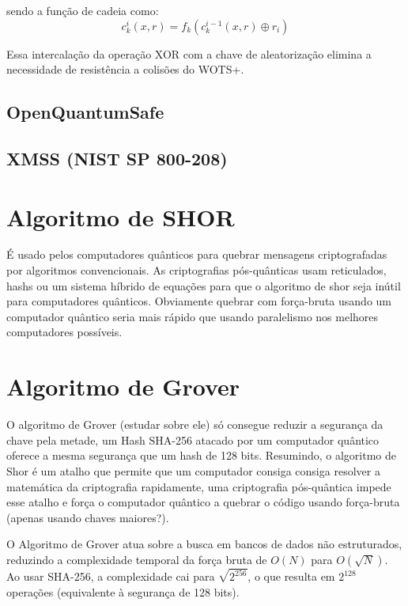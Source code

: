 \documentclass[12pt, a4paper]{report}
\begin{document}
sendo a função de cadeia como:
$$c^i_k(x,r)=f_k(c^{i-1}_k(x,r) \oplus r_i)$$

Essa intercalação da operação XOR com a chave de aleatorização elimina a necessidade de resistência a colisões do WOTS+.

\subsection{OpenQuantumSafe}
\subsection{XMSS (NIST SP 800-208)}


\section{Algoritmo de SHOR}
É usado pelos computadores quânticos para quebrar mensagens criptografadas por algoritmos convencionais. As criptografias pós-quânticas usam reticulados, hashs ou um sistema híbrido de equações para que o algoritmo de shor seja inútil para computadores quânticos. Obviamente quebrar com força-bruta usando um computador quântico seria mais rápido que usando paralelismo nos melhores computadores possíveis. 

\section{Algoritmo de Grover}
O algoritmo de Grover (estudar sobre ele) só consegue reduzir a segurança da chave pela metade, um Hash SHA-256 atacado por um computador quântico oferece a mesma segurança que um hash de 128 bits. Resumindo, o algoritmo de Shor é um atalho que permite que um computador consiga consiga resolver a matemática da criptografia rapidamente, uma criptografia pós-quântica impede esse atalho e força o computador quântico a quebrar o código usando força-bruta (apenas usando chaves maiores?).

O Algoritmo de Grover atua sobre a busca em bancos de dados não estruturados, reduzindo a complexidade temporal da força bruta de $O(N)$ para $O(\sqrt{N})$. Ao usar SHA-256, a complexidade cai para $\sqrt{2^{256}}$, o que resulta em $2^{128}$ operações (equivalente à segurança de 128 bits).

\end{document}
